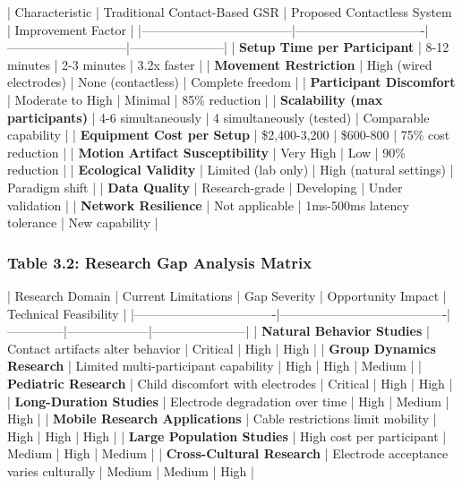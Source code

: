 \documentclass[12pt,a4paper]{article}
\begin{document}
| Characteristic                     | Traditional Contact-Based GSR | Proposed Contactless System | Improvement Factor    |
|------------------------------------|-------------------------------|-----------------------------|-----------------------|
| \textbf{Setup Time per Participant}     | 8-12 minutes                  | 2-3 minutes                 | 3.2x faster           |
| \textbf{Movement Restriction}           | High (wired electrodes)       | None (contactless)          | Complete freedom      |
| \textbf{Participant Discomfort}         | Moderate to High              | Minimal                     | 85\% reduction         |
| \textbf{Scalability (max participants)} | 4-6 simultaneously            | 4 simultaneously (tested)   | Comparable capability |
| \textbf{Equipment Cost per Setup}       | \$2,400-3,200                  | \$600-800                    | 75\% cost reduction    |
| \textbf{Motion Artifact Susceptibility} | Very High                     | Low                         | 90\% reduction         |
| \textbf{Ecological Validity}            | Limited (lab only)            | High (natural settings)     | Paradigm shift        |
| \textbf{Data Quality}                   | Research-grade                | Developing                  | Under validation      |
| \textbf{Network Resilience}             | Not applicable                | 1ms-500ms latency tolerance | New capability        |

\subsubsection{Table 3.2: Research Gap Analysis Matrix}

| Research Domain                  | Current Limitations                    | Gap Severity | Opportunity Impact | Technical Feasibility |
|----------------------------------|----------------------------------------|--------------|--------------------|-----------------------|
| \textbf{Natural Behavior Studies}     | Contact artifacts alter behavior       | Critical     | High               | High                  |
| \textbf{Group Dynamics Research}      | Limited multi-participant capability   | High         | High               | Medium                |
| \textbf{Pediatric Research}           | Child discomfort with electrodes       | Critical     | High               | High                  |
| \textbf{Long-Duration Studies}        | Electrode degradation over time        | High         | Medium             | High                  |
| \textbf{Mobile Research Applications} | Cable restrictions limit mobility      | High         | High               | High                  |
| \textbf{Large Population Studies}     | High cost per participant              | Medium       | High               | Medium                |
| \textbf{Cross-Cultural Research}      | Electrode acceptance varies culturally | Medium       | Medium             | High                  |
\end{document}
